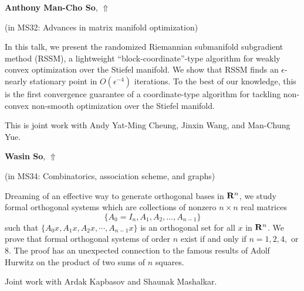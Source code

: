 \documentclass[ILAS2025-program.tex]{subfiles}
\begin{document}
\hypertarget{down0186}{}\begin{ilasabstract}
    
\textbf{Anthony Man-Cho So},  \hfill \hyperlink{up0186}{$\Uparrow$}
    
    
(in {\color{mstitle}MS32: Advances in matrix manifold optimization})
        
\mtskip
    In this talk, we present the randomized Riemannian submanifold subgradient method (RSSM), a lightweight ``block-coordinate''-type algorithm for weakly convex optimization over the Stiefel manifold. We show that RSSM finds an $\epsilon$-nearly stationary point in $O(\epsilon^{-4})$ iterations. To the best of our knowledge, this is the first convergence guarantee of a coordinate-type algorithm for tackling non-convex non-smooth optimization over the Stiefel manifold.

This is joint work with Andy Yat-Ming Cheung, Jinxin Wang, and Man-Chung Yue.

\end{ilasabstract}
    

\hypertarget{down0325}{}\begin{ilasabstract}
    
\textbf{Wasin So},  \hfill \hyperlink{up0325}{$\Uparrow$}
    
    
(in {\color{mstitle}MS34: Combinatorics, association scheme, and graphs})
        
\mtskip
    Dreaming of an effective way to generate orthogonal bases in ${\bf R}^n$, 
we study  formal orthogonal systems which are  collections of nonzero $n \times n$  real matrices 
\[ \{A_0=I_n, A_1, A_2, \ldots,A_{n-1}\}\]
such that $\{A_0x, A_1x,A_2x,\cdots,A_{n-1}x\}$
 is an orthogonal set for all $x$ in ${\bf R}^n$. We prove that 
 formal orthogonal systems of order $n$ exist if and only if $n=1, 2,4,$ or  $8$.
 The proof has an unexpected connection to the famous results of Adolf Hurwitz
  on the product of two sums of $n$ squares.
 
 \vspace{.3in}
 
 Joint work with Ardak Kapbasov and Shaunak Mashalkar.
\end{ilasabstract}
    
\end{document}
